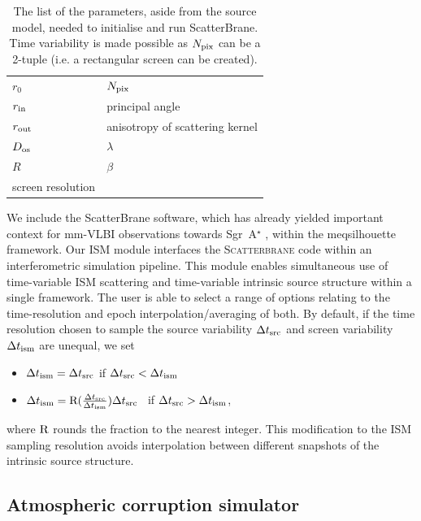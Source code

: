 \begin{table}
\centering
\caption{The list of the parameters, aside from the source model, needed to initialise and run {\sc ScatterBrane}. Time variability is made possible as $N_{\rm pix}$ can be a 2-tuple (i.e. a rectangular screen can be created).
}
\begin{tabular}{ll}\label{tab:parm_ism}
$r_0$            & $N_{\rm pix}$ \\
$r_{\rm in}$     & principal angle             \\
$r_{\rm out}$    & anisotropy of scattering kernel    \\
$D_{\rm os}$     & $\lambda$        \\
$R$              & $\beta$          \\
screen resolution &               
\end{tabular}
\end{table}



We include the {\sc ScatterBrane} software, which has already yielded important context for mm-VLBI observations towards Sgr~A$^\star$ \citep[e.g.][]{Ortiz_2016}, within the {\sc meqsilhouette} framework. Our ISM module interfaces the \textsc{Scatterbrane} code within an interferometric simulation pipeline. This module enables simultaneous use of time-variable ISM scattering and time-variable intrinsic source structure within a single framework. The user is able to select a range of options relating to the time-resolution and epoch interpolation/averaging of both. By default, if the time resolution chosen to sample the source variability $\Delta t_{\rm src}$ and screen variability $\Delta t_{\rm ism}$ are unequal, we set  
\begin{itemize}
 \setlength\itemsep{1em}
\item $\Delta t_{\rm ism}=\Delta t_{\rm src}$ \qquad \qquad if \qquad  $\Delta t_{\rm src} < \Delta t_{\rm ism}$
\item $\Delta t_{\rm ism}={\rm R}(\frac{\Delta t_{\rm src}}{\Delta t_{\rm ism}})\Delta t_{\rm src}$ \ if \qquad  $\Delta t_{\rm src} > \Delta t_{\rm ism}$,
\end{itemize}
where ${\rm R}$ rounds the fraction to the nearest integer.  This modification to the ISM sampling resolution avoids interpolation between different snapshots of the intrinsic source structure.


\subsection{Atmospheric corruption simulator}\label{sec:trop_imp}

